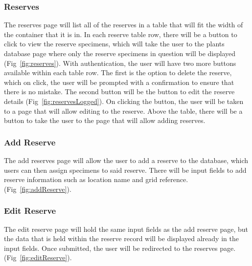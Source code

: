         \subsubsection{Reserves}
            The reserves page will list all of the reserves in a table that will fit the width of the container that it is in. In each reserve table row, there will be a button to click to view the reserve specimens, which will take the user to the plants database page where only the reserve specimens in question will be displayed  (Fig~\ref{fig:reserves}). With authentication, the user will have two more buttons available within each table row. The first is the option to delete the reserve, which on click, the user will be prompted with a confirmation to ensure that there is no mistake. The second button will be the button to edit the reserve details (Fig~\ref{fig:reservesLogged}). On clicking the button, the user will be taken to a page that will allow editing to the reserve. Above the table, there will be a button to take the user to the page that will allow adding reserves.

        \subsubsection{Add Reserve}
           The add reserves page will allow the user to add a reserve to the database, which users can then assign specimens to said reserve. There will be input fields to add reserve information such as location name and grid reference.  (Fig~\ref{fig:addReserve}). 
        
        \subsubsection{Edit Reserve}
           The edit reserve page will hold the same input fields as the add reserve page, but the data that is held within the reserve record will be displayed already in the input fields. Once submitted, the user will be redirected to the reserves page. (Fig~\ref{fig:editReserve}).

